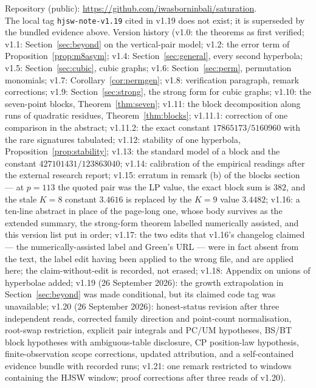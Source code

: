 \documentclass[11pt]{article}
\theoremstyle{remark}
\begin{document}
{\sloppy Repository (public): \url{https://github.com/iwasborninbali/saturation}.\\
The local tag \texttt{hjsw-note-v1.19} cited in v1.19 does not exist; it is superseded by the bundled evidence above.  Version history (v1.0: the theorems as first verified; v1.1: Section~\ref{sec:beyond} on the vertical-pair model; v1.2: the error term of Proposition~\ref{prop:m8asym}; v1.4: Section~\ref{sec:general}, every second hyperbola; v1.5: Section~\ref{sec:cubic}, cubic graphs; v1.6: Section~\ref{sec:perm}, permutation monomials; v1.7: Corollary~\ref{cor:permgen}; v1.8: verification paragraph, remark corrections; v1.9: Section~\ref{sec:strong}, the strong form for cubic graphs; v1.10: the seven-point blocks, Theorem~\ref{thm:seven}; v1.11: the block decomposition along runs of quadratic residues, Theorem~\ref{thm:blocks}; v1.11.1: correction of one comparison in the abstract; v1.11.2: the exact constant $17865173/5160960$ with the rare signatures tabulated; v1.12: stability of one hyperbola, Proposition~\ref{prop:stability}; v1.13: the standard model of a block and the constant $427101431/123863040$; v1.14: calibration of the empirical readings after the external research report; v1.15: erratum in remark (b) of the blocks section --- at $p=113$ the quoted pair was the LP value, the exact block sum is $382$, and the stale $K=8$ constant $3.4616$ is replaced by the $K=9$ value $3.4482$; v1.16: a ten-line abstract in place of the page-long one, whose body survives as the extended summary, the strong-form theorem labelled numerically assisted, and this version list put in order; v1.17: the two edits that v1.16's changelog claimed --- the numerically-assisted label and Green's URL --- were in fact absent from the text, the label edit having been applied to the wrong file, and are applied here; the claim-without-edit is recorded, not erased; v1.18: Appendix on unions of hyperbolae added; v1.19 (26 September 2026): the growth extrapolation in Section~\ref{sec:beyond} was made conditional, but its claimed code tag was unavailable;
v1.20 (26 September 2026): honest-status revision after three independent reads, corrected family direction and point-count normalisation,
root-swap restriction, explicit pair integrals and PC/UM hypotheses, BS/BT block hypotheses with ambiguous-table disclosure,
CP position-law hypothesis, finite-observation scope corrections, updated attribution, and a self-contained evidence bundle with recorded runs;
v1.21: one remark restricted to windows containing the HJSW window; proof corrections after three reads of v1.20).\par}
\end{document}
